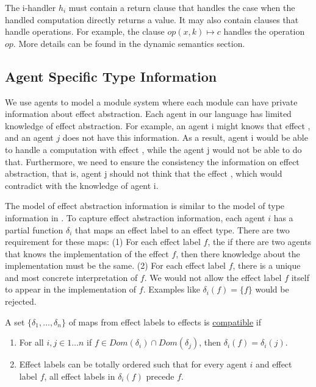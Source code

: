 The i-handler $h_i$ must contain a return clause that handles the case when the handled computation directly returns a value. It may also contain clauses that handle operations. For example, the clause $op(x, k) \mapsto c$ handles the operation $op$. More details can be found in the dynamic semantics section.

\subsection{Agent Specific Type Information}
We use agents to model a module system where each module can have private information about effect abstraction. Each agent in our language has limited knowledge of effect abstraction. For example, an agent i might knows that effect , and an agent $j$ does not have this information. As a result, agent i would be able to handle a computation with effect , while the agent j would not be able to do that. Furthermore, we need to ensure the consistency the information on effect abstraction, that is, agent j should not think that the effect , which would contradict with the knowledge of agent i. 

The model of effect abstraction information is similar to the model of type information in \cite{grossman00}. To capture effect abstraction information, each agent $i$ has a partial function $\delta_i$ that maps an effect label to an effect type. There are two requirement for these maps: (1) For each effect label $f$, the if there are two agents that knows the implementation of the effect $f$, then there knowledge about the implementation must be the same. (2) For each effect label $f$, there is a unique and most concrete interpretation of $f$. We would not allow the effect label $f$ itself to appear in the implementation of $f$. Examples like $\delta_i(f) = \{f\}$ would be rejected.

\begin{definition}
A set $\{\delta_1, \dots, \delta_n\}$ of maps from effect labels to effects is \underline{compatible} if
\begin{enumerate}
\item For all $i, j \in 1 \dots n$ if $f \in Dom(\delta_i) \cap Dom(\delta_j)$, then $\delta_i(f) = \delta_i(j)$.
\item Effect labels can be totally ordered such that for every agent $i$ and effect label $f$, all effect labels in $\delta_i(f)$ precede $f$.
\end{enumerate}
\end{definition}

